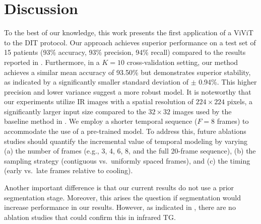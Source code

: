 \documentclass[runningheads]{llncs}
\begin{document}

\newpage

\section{Discussion}
\label{sec:discussion}
To the best of our knowledge, this work presents the first application
of a \ac{ViViT} to the \ac{DIT} protocol. Our approach achieves
superior performance on a test set of 15 patients (93\% accuracy, 93\%
precision, 94\% recall) compared to the results reported in
\cite{DeMatheus2023}. Furthermore, in a $K=10$ cross-validation
setting, our method achieves a similar mean accuracy of 93.50\% but
demonstrates superior stability, as indicated by a significantly
smaller standard deviation of $\pm$ 0.94\%. This higher precision and
lower variance suggest a more robust model. It is noteworthy that our
experiments utilize \ac{IR} images with a spatial resolution of
$224 \times 224$ pixels, a significantly larger input size compared to
the $32 \times 32$ images used by the baseline method in
\cite{DeMatheus2023}. We employ a shorter temporal sequence ($F=8$
frames) to accommodate the use of a pre-trained model. To address
this, future ablations studies should quantify the incremental value of
temporal modeling by varying (a) the number of frames (e.g., 3, 4, 6,
8, and the full 20-frame sequence), (b) the sampling strategy
(contiguous vs.\ uniformly spaced frames), and (c) the timing (early
vs.\ late frames relative to cooling).

Another important difference is that our current results do
not use a prior segmentation stage. Moreover, this arises the question
if segmentation would increase performance in our results. However, as
indicated in \cite{Ryan2025}, there are no ablation studies that could
confirm this in infrared \ac{TG}.
\end{document}
